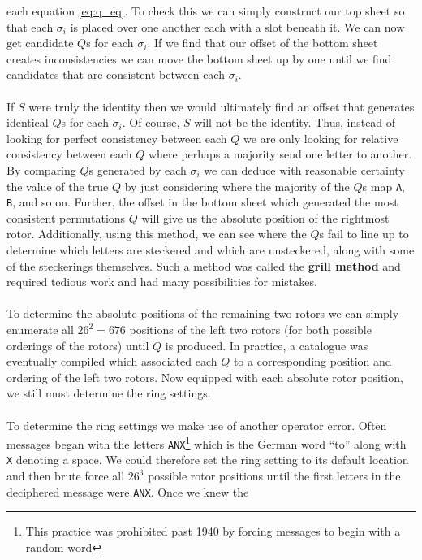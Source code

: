 each equation \ref{eq:q_eq}. To check this we can simply construct
our top sheet so that each $\sigma_i$ is placed over one another each
with a slot beneath it. We can now get candidate $Q$s for each
$\sigma_i$. If we find that our offset of the bottom sheet creates
inconsistencies we can move the bottom sheet up by one until we find
candidates that are consistent between each $\sigma_i$.
\\\\If $S$ were truly the identity then we would ultimately find an
offset that generates identical $Q$s for each $\sigma_i$. Of course,
$S$ will not be the identity. Thus, instead of looking for perfect
consistency between each $Q$ we are only looking for relative
consistency between each $Q$ where perhaps a majority send one letter
to another. By comparing $Q$s generated by each $\sigma_i$ we can
deduce with reasonable certainty the value of the true $Q$ by just
considering where the majority of the $Q$s map \texttt{A},
\texttt{B}, and so on. Further, the offset in the bottom sheet which
generated the most consistent permutations $Q$ will give us the
absolute position of the rightmost rotor. Additionally, using this
method, we can see where the $Q$s fail to line up to determine which
letters are steckered and which are unsteckered, along with some of
the steckerings themselves. Such a method was called the {\bf{grill
			method}} and required tedious work and had many possibilities for mistakes.
\\\\To determine the absolute positions of the remaining two rotors
we can simply enumerate all $26^2 = 676$ positions of the left two
rotors (for both possible orderings of the rotors) until $Q$ is
produced. In practice, a catalogue was eventually compiled which
associated each $Q$ to a corresponding position and ordering of the
left two rotors. Now equipped with each absolute rotor position, we
still must determine the ring settings.
\\\\To determine the ring settings we make use of another operator
error. Often messages began with the letters \texttt{ANX}\footnote{This practice was prohibited past 1940 by forcing messages to begin with a random word} which is
the German word ``to'' along with \texttt{X} denoting a space. We
could therefore set the ring setting to its default location and then
brute force all $26^3$ possible rotor positions until the first
letters in the deciphered message were \texttt{ANX}. Once we knew the
